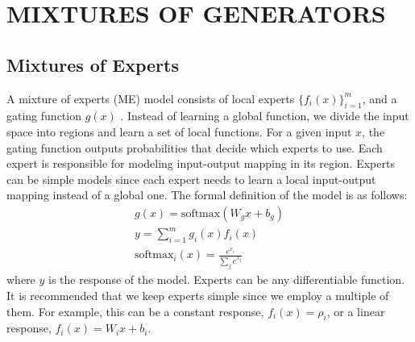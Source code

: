 \documentclass[a4paper,onesided,12pt]{report}
\begin{document}
\chapter{MIXTURES OF GENERATORS}
\label{chapter:mixture_gan}

\section{Mixtures of Experts}
\label{sec:me}
A mixture of experts (ME) model consists of local experts $\{f_i(x)\}_{i=1}^{m}$, and a gating function $g(x)$ \cite{jacobs1991adaptive}. Instead of learning a global function, we divide the input space into regions and learn a set of local functions. For a given input $x$, the gating function outputs probabilities that decide which experts to use. Each expert is responsible for modeling input-output mapping in its region. Experts can be simple models since each expert needs to learn a local input-output mapping instead of a global one. The formal definition of the model is as follows:
\begin{gather}
g(x) = \text{softmax}(W_g x + b_g)\\
y = \sum_{i=1}^m g_i(x) f_i(x)\\
\text{softmax}_i(x) = \frac{e^{x_i}}{\sum_j e^{x_j}}
\end{gather}
where $y$ is the response of the model. Experts can be any differentiable function. It is recommended that we keep experts simple since we employ a multiple of them. For example, this can be a constant response, $f_i(x)=\rho_i$, or a linear response, $f_i(x)=W_i x + b_i$.
%
\end{document}
